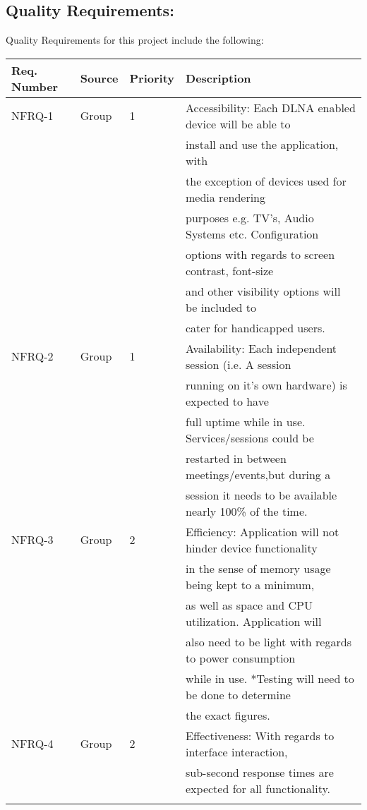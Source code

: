 \documentclass[12pt]{article}
\begin{document}
\subsection{Quality Requirements:}
Quality Requirements for this project include the following:
\begin{center} \begin{tabular}[h]{|l|l|l|l|}
\hline
Req. Number & Source & Priority & Description \\
\hline
NFRQ-1 & Group & 1 & Accessibility: Each DLNA enabled device will be able to\\ & & & 
									 install and use the application, with \\ & & & 
									 the exception of devices used for media rendering \\ & & & 
									 purposes e.g. TV's, Audio Systems etc. Configuration\\ & & &  options with regards to screen contrast, font-size \\ & & & 
									 and other visibility options will be included to \\ & & & 
									 cater for handicapped users.\\
\hline
NFRQ-2 & Group & 1 & Availability: Each independent session (i.e. A session\\ & & & 
					 running on it's own hardware) is expected to have \\ & & & 
					 full uptime while in use. Services/sessions could be\\ & & & 
					  restarted in between meetings/events,but during a\\ & & & 
					   session it needs to be available nearly 100\% of the time. \\
\hline
NFRQ-3 & Group & 2 & Efficiency: Application will not hinder device functionality \\ & & & 	
					in the sense of memory usage being kept to a minimum, \\ & & & 
					as well as space and CPU utilization. Application will \\ & & & 
					 also need to be light with regards to power consumption\\ & & & 
					  while in use. *Testing will need to be done to determine\\ & & & 
					   the exact figures. \\
\hline
NFRQ-4 & Group & 2 & Effectiveness: With regards to interface interaction, \\ & & & 
					sub-second response times are expected for all functionality.\\ & & & 

\end{tabular}
\end{center}
\end{document}
